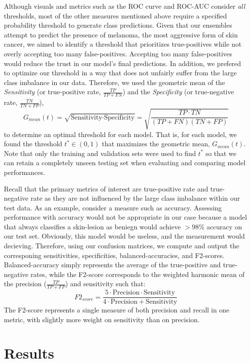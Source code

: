 \documentclass [MAS] {uclathes}
\begin{document}
Although visuals and metrics such as the ROC curve and ROC-AUC consider \textit{all} thresholds, most of the other measures mentioned above require a specified probability threshold to generate class predictions. Given that our ensembles attempt to predict the presence of melanoma, the most aggressive form of skin cancer, we aimed to identify a threshold that prioritizes true-positives while not overly accepting too many false-positives. Accepting too many false-positives would reduce the trust in our model's final predictions. In addition, we prefered to optimize our threshold in a way that does not unfairly suffer from the large class imbalance in our data. Therefore, we used the geometric mean of the \textit{Sensitivity} (or true-positive rate, $\frac{TP}{TP+FN}$) and the \textit{Specificity} (or true-negative rate, $\frac{TN}{TN+FP}$), $$G_{mean}(t) = \sqrt{\text{Sensitivity} \cdot \text{Specificity}} = \sqrt{\frac{TP \cdot TN }{(TP + FN)(TN + FP)}}$$ to determine an optimal threshold for each model. That is, for each model, we found the threshold $t^* \in (0, 1)$ that maximizes the geometric mean, $G_{mean}(t)$. Note that only the training and validation sets were used to find $t^*$ so that we can retain a completely unseen testing set when evaluating and comparing model performances.

Recall that the primary metrics of interest are true-positive rate and true-negative rate as they are not influenced by the large class imbalance within our test data. As an example, consider a measure such as accuracy. Assessing performance with accuracy would not be appropriate in our case because a model that always classifies a skin-lesion as beniegn would achieve $>98$\% accuracy on our test set. Obviously, this model would be useless, and the measurement would decieving. Therefore, using our confusion matrices, we compute and output the corresponing sensitivities, specificities, balanced-accuracies, and F2-scores. Balanced-accuracy simply represents the average of the true-positive and true-negative rates, while the F2-score corresponds to the weighted harmonic mean of the precision ($\frac{TP}{TP + FP}$) and sensitivity such that: $$F2_{score} = \frac{5 \cdot \text{Precision} \cdot \text{Sensitivity}}{4 \cdot \text{Precision} +\text{Sensitivity}}$$ The F2-score represents a single measure of both precision and recall in one metric, with slightly more weight on sensitivity than on precision.

\chapter{Results}
\end{document}
